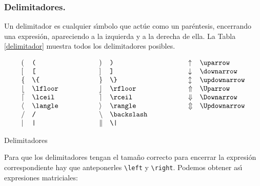 \subsubsection{Delimitadores.}

Un delimitador es cualquier s{\'\i}mbolo que act{\'u}e como un par{\'e}ntesis,
encerrando una expresi{\'o}n, apareciendo a la izquierda y a la derecha de
ella. La Tabla \ref{delimitador} muestra todos los delimitadores
posibles.

\begin{table}
$$
\begin{array}{ll@{\hspace{2cm}}ll@{\hspace{2cm}}ll}
( & \verb+(+ &
) & \verb+)+&
\uparrow & \verb+\uparrow+ \\
\mbox{$[$} & \verb+[+ &
] & \verb+]+ &
\downarrow & \verb+\downarrow+ \\
\{ & \verb+\{+ &
\} & \verb+\}+ &
\updownarrow & \verb+\updownarrow+ \\
\lfloor & \verb+\lfloor+ &
\rfloor & \verb+\rfloor+ &
\Uparrow & \verb+\Uparrow+ \\
\lceil & \verb+\lceil+ &
\rceil & \verb+\rceil+ &
\Downarrow & \verb+\Downarrow+ \\
\langle & \verb+\langle+ &
\rangle & \verb+\rangle+ &
\Updownarrow & \verb+\Updownarrow+ \\
/ & \verb+/+ &
\backslash & \verb+\backslash+ \\
| & \verb+|+ &
\| & \verb+\|+ \\
\end{array}
$$
\caption{Delimitadores}
\label{delimitador}
\end{table}

Para que los delimitadores tengan el tama{\~n}o correcto para encerrar
la expresi{\'o}n correspondiente hay que anteponerles \verb+\left+ y
\verb+\right+. Podemos obtener as\'{\i} expresiones matriciales:

